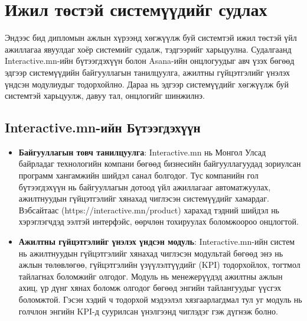 \section{Ижил төстэй системүүдийг судлах}
Эндээс бид дипломын ажлын хүрээнд хөгжүүлж буй системтэй ижил төстэй үйл ажиллагаа явуулдаг хоёр системийг судалж, тэдгээрийг харьцуулна. Судалгаанд Interactive.mn-ийн бүтээгдэхүүн болон Asana-ийн онцлогуудыг авч үзэх бөгөөд эдгээр системүүдийн байгууллагын танилцуулга, ажилтны гүйцэтгэлийг үнэлэх үндсэн модулиудыг тодорхойлно. Дараа нь эдгээр системүүдийг хөгжүүлж буй системтэй харьцуулж, давуу тал, онцлогийг шинжилнэ.

\subsection{Interactive.mn-ийн Бүтээгдэхүүн}
\begin{itemize}
    \item \textbf{Байгууллагын товч танилцуулга}: Interactive.mn нь Монгол Улсад байрладаг технологийн компани бөгөөд бизнесийн байгууллагуудад зориулсан программ хангамжийн шийдэл санал болгодог. Тус компанийн гол бүтээгдэхүүн нь байгууллагын дотоод үйл ажиллагааг автоматжуулах, ажилтнуудын гүйцэтгэлийг хянахад чиглэсэн системүүдийг хамардаг. Вэбсайтаас (https://interactive.mn/product) харахад тэдний шийдэл нь хэрэглэгчдэд ээлтэй интерфэйс, өөрчлөн тохируулах боломжоороо онцлогтой.
    \item \textbf{Ажилтны гүйцэтгэлийг үнэлэх үндсэн модуль}: Interactive.mn-ийн систем нь ажилтнуудын гүйцэтгэлийг хянахад чиглэсэн модультай бөгөөд энэ нь ажлын төлөвлөгөө, гүйцэтгэлийн үзүүлэлтүүдийг (KPI) тодорхойлох, тогтмол тайлагнах боломжийг олгодог. Модуль нь менежерүүдэд ажилтны ажлын ахиц, үр дүнг хянах боломж олгодог бөгөөд энгийн тайлангуудыг үүсгэх боломжтой. Гэсэн хэдий ч тодорхой мэдээлэл хязгаарлагдмал тул уг модуль нь голчлон энгийн KPI-д суурилсан үнэлгээнд чиглэдэг гэж дүгнэж болно.
\end{itemize}

